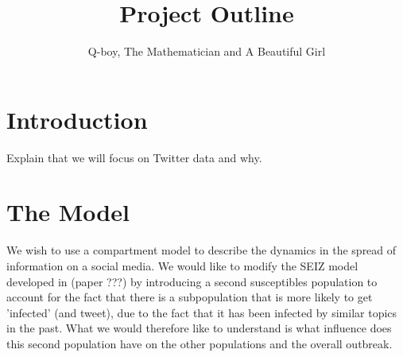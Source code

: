 \documentclass{article}
\author{Q-boy, The Mathematician and A Beautiful Girl}
\title{Project Outline}
\begin{document}
\maketitle
\usetikzlibrary{arrows,automata}
\section{Introduction}
Explain that we will focus on Twitter data and why.

\section{The Model}
We wish to use a compartment model to describe the dynamics in the spread of information on a social media. We would like to modify the SEIZ model developed in (paper ???) by introducing a second susceptibles population to account for the fact that there is a subpopulation that is more likely to get 'infected' (and tweet), due to the fact that it has been infected by similar topics in the past. What we would therefore like to understand is what influence does this second population have on the other populations and the overall outbreak.
\end{document}
